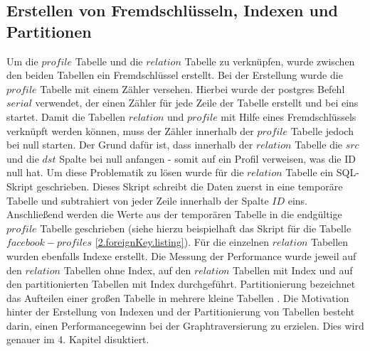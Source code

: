 \subsection{Erstellen von Fremdschlüsseln, Indexen und Partitionen}
Um die $profile$ Tabelle und die $relation$ Tabelle zu verknüpfen, wurde zwischen den beiden Tabellen ein Fremdschlüssel erstellt.
Bei der Erstellung wurde die $profile$ Tabelle mit einem Zähler versehen.
Hierbei wurde der postgres Befehl $serial$ verwendet, der einen Zähler für jede Zeile der Tabelle erstellt und bei eins startet.
Damit die Tabellen $relation$ und $profile$ mit Hilfe eines Fremdschlüssels verknüpft werden können, muss der Zähler innerhalb der $profile$ Tabelle jedoch bei null starten.
Der Grund dafür ist, dass innerhalb der $relation$ Tabelle die $src$ und die $dst$ Spalte bei null anfangen - somit auf ein Profil verweisen, was die ID null hat.
Um diese Problematik zu lösen wurde für die $relation$ Tabelle ein SQL-Skript geschrieben.
Dieses Skript schreibt die Daten zuerst in eine temporäre Tabelle und subtrahiert von jeder Zeile innerhalb der Spalte $ID$ eins.
Anschließend werden die Werte aus der temporären Tabelle in die endgültige $profile$ Tabelle geschrieben (siehe hierzu beispielhaft das Skript für die Tabelle $facebook-profiles$ \ref{2.foreignKey.listing}).
Für die einzelnen $relation$ Tabellen wurden ebenfalls Indexe erstellt.
Die Messung der Performance wurde jeweil auf den $relation$ Tabellen ohne Index, auf den $relation$ Tabellen mit Index und auf den partitionierten Tabellen mit Index durchgeführt.
Partitionierung bezeichnet das Aufteilen einer großen Tabelle in mehrere kleine Tabellen \cite{postgrespartitioning}.
Die Motivation hinter der Erstellung von Indexen und der Partitionierung von Tabellen besteht darin, einen Performancegewinn bei der Graphtraversierung zu erzielen.
Dies wird genauer im 4. Kapitel disuktiert.